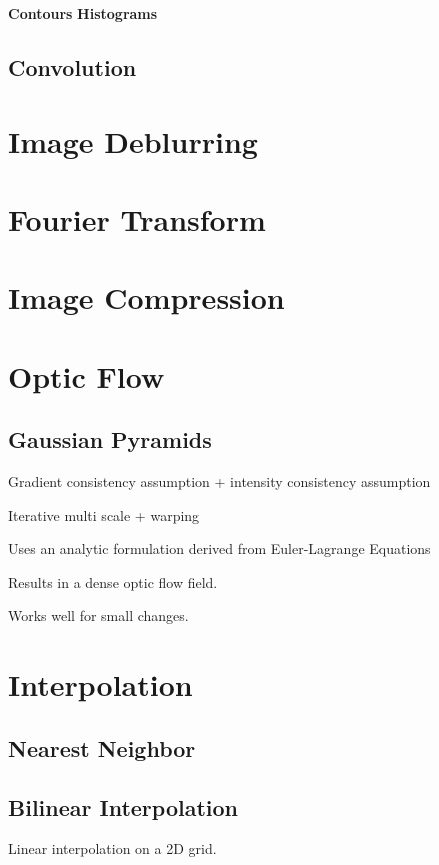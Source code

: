 \textbf{Contours}
\textbf{Histograms}

\subsection{Convolution}

\section{Image Deblurring}

\section{Fourier Transform}

\section{Image Compression}

\section{Optic Flow}

\subsection{Gaussian Pyramids}

Gradient consistency assumption + intensity consistency assumption

Iterative multi scale + warping

Uses an analytic formulation derived from Euler-Lagrange Equations

Results in a dense optic flow field.

Works well for small changes.

\section{Interpolation}

\subsection{Nearest Neighbor}

\subsection{Bilinear Interpolation}

Linear interpolation on a 2D grid. 

